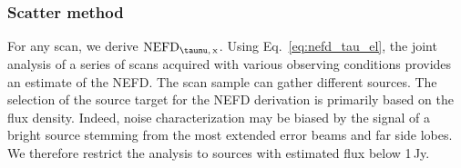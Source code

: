 \subsubsection{Scatter method}
For any scan, we derive $\rm{NEFD}_{\taunu,\, x}$.
Using Eq.~\ref{eq:nefd_tau_el}, the joint analysis of a series of
scans acquired with various observing conditions provides an estimate
of the NEFD. The scan sample can gather different sources. 
The selection of the source target for the NEFD derivation is
primarily based on the flux density. Indeed, noise
characterization may be biased {\lp by the signal of a bright source
stemming from the most extended error beams and far side lobes.}
We therefore restrict the analysis to sources with estimated flux below 1\,Jy.


